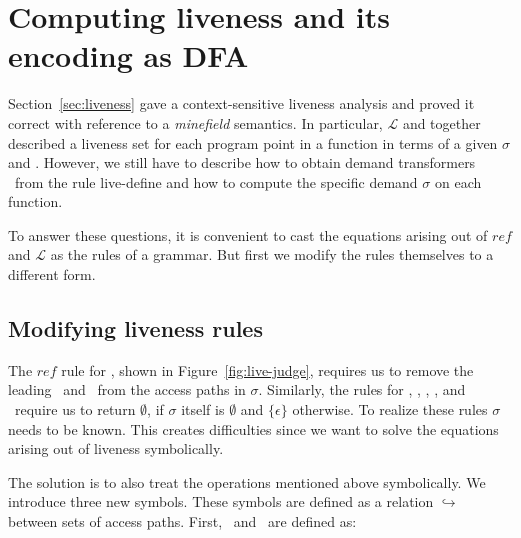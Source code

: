 \documentclass[9pt]{sigplanconf}
\begin{document}
 

\section{Computing liveness and its encoding as DFA}\label{sec:computing}
Section~\ref{sec:liveness} gave  a context-sensitive liveness analysis
and  {\color  {red}  proved  it  correct  with  reference  to  a  {\em
    minefield} semantics}.  In  particular, $\mathcal{L}$ and 
together described a liveness set for each program point in a function
in terms of  a given $\sigma$ and \Lfonly.  However,  we still have to
describe how to obtain demand transformers \Lfonly\ from the rule {\sc
  live-define} and how to compute the specific demand $\sigma$ on each
function.

To  answer these  questions, it  is convenient  to cast  the equations
arising out of $\mathit{ref}$  and $\mathcal{L}$ as the rules of a
grammar.   But first  we modify  the rules  themselves to  a different
form.

\subsection{Modifying liveness rules}

The      $\mathit{ref}$     rule      for     \CONS,      shown     in
Figure~\ref{fig:live-judge},  requires   us  to  remove   the  leading
\acar\ and \acdr\  from the access paths in  $\sigma$.  Similarly, the
rules for  \CAR, \CDR, \PRIM, \NULLQ,  and \SIF\ require  us to return
$\emptyset$, if  $\sigma$ itself is $\emptyset$ and
$\lbrace\epsilon\rbrace$ otherwise.  To  realize these rules
$\sigma$ needs to be known. This creates difficulties since we want to
solve the equations arising out of liveness symbolically.

The  solution  is  to   also  treat  the  operations  mentioned  above
symbolically.   We  introduce three  new  symbols.  These symbols  are
defined as a relation  $\hookrightarrow$ between sets of access paths.
First, \bcar\ and \bcdr\ are defined as:
\end{document}
